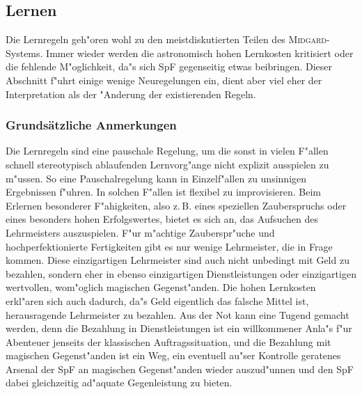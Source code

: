 \documentclass[10pt,a4paper,germanpar]{article}
\begin{document}
\subsection{Lernen}
\label{lernen}

Die Lernregeln geh"oren wohl zu den meistdiskutierten Teilen des
\textsc{Midgard}-Systems. Immer wieder werden die astronomisch hohen
Lernkosten kritisiert oder die fehlende M"oglichkeit, da"s sich SpF
gegenseitig etwas beibringen. Dieser Abschnitt f"uhrt einige wenige
Neuregelungen ein, dient aber viel eher der Interpretation als der
"Anderung der existierenden Regeln.

\subsubsection{Grundsätzliche Anmerkungen}

Die Lernregeln sind eine pauschale Regelung, um die sonst in vielen
F"allen schnell stereotypisch ablaufenden Lernvorg"ange nicht explizit
ausspielen zu m"ussen. So eine Pauschalregelung kann in Einzelf"allen
zu unsinnigen Ergebnissen f"uhren. In solchen F"allen ist flexibel zu
improvisieren. Beim Erlernen besonderer F"ahigkeiten, also z.\,B.
eines speziellen Zauberspruchs oder eines besonders hohen
Erfolgswertes, bietet es sich an, das Aufsuchen des Lehrmeisters
auszuspielen. F"ur m"achtige Zauberspr"uche und hochperfektionierte
Fertigkeiten gibt es nur wenige Lehrmeister, die in Frage kommen.
Diese einzigartigen Lehrmeister sind auch nicht unbedingt mit Geld zu
bezahlen, sondern eher in ebenso einzigartigen Dienstleistungen oder
einzigartigen wertvollen, wom"oglich magischen Gegenst"anden. Die
hohen Lernkosten erkl"aren sich auch dadurch, da"s Geld eigentlich das
falsche Mittel ist, herausragende Lehrmeister zu bezahlen. Aus der Not
kann eine Tugend gemacht werden, denn die Bezahlung in
Dienstleistungen ist ein willkommener Anla"s f"ur Abenteuer jenseits
der klassischen Auftragssituation, und die Bezahlung mit magischen
Gegenst"anden ist ein Weg, ein eventuell au"ser Kontrolle geratenes
Arsenal der SpF an magischen Gegenst"anden wieder auszud"unnen und den
SpF dabei gleichzeitig ad"aquate Gegenleistung zu bieten.
\end{document}
